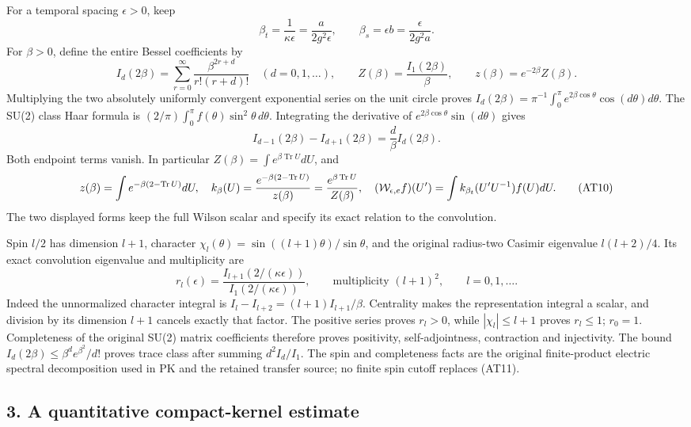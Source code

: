 \documentclass[11pt]{article}
\begin{document}
For a temporal spacing \(\epsilon>0\), keep
\[
 \beta_t=\frac1{\kappa\epsilon}=\frac{a}{2g^2\epsilon},
 \qquad \beta_s=\epsilon b=\frac{\epsilon}{2g^2a}.
 \tag{AT7}
\]
For \(\beta>0\), define the entire Bessel coefficients by
\[
 I_d(2\beta)=\sum_{r=0}^{\infty}
       \frac{\beta^{2r+d}}{r!(r+d)!}\quad(d=0,1,\ldots),\qquad
 Z(\beta)=\frac{I_1(2\beta)}{\beta},\qquad
 z(\beta)=e^{-2\beta}Z(\beta).
 \tag{AT8}
\]
Multiplying the two absolutely uniformly convergent exponential series on the unit circle proves
\(I_d(2\beta)=\pi^{-1}\int_0^\pi e^{2\beta\cos\theta}\cos(d\theta)d\theta\).
The SU(2) class Haar formula is
\((2/\pi)\int_0^\pi f(\theta)\sin^2\theta\,d\theta\).
Integrating the derivative of
\(e^{2\beta\cos\theta}\sin(d\theta)\) gives
\[
 I_{d-1}(2\beta)-I_{d+1}(2\beta)=\frac d\beta I_d(2\beta).
 \tag{AT9}
\]
Both endpoint terms vanish. In particular \(Z(\beta)=\int e^{\beta\operatorname{Tr}U}dU\), and
\[
 z(\beta)=\int e^{-\beta(2-\operatorname{Tr}U)}dU,\quad
 k_\beta(U)=\frac{e^{-\beta(2-\operatorname{Tr}U)}}{z(\beta)}
           =\frac{e^{\beta\operatorname{Tr}U}}{Z(\beta)},\quad
 ({\cal W}_{\epsilon,e}f)(U')=\int k_{\beta_t}(U'U^{-1})f(U)dU.
 \tag{AT10}
\]
The two displayed forms keep the full Wilson scalar and specify its exact relation to the convolution.

Spin \(l/2\) has dimension \(l+1\), character
\(\chi_l(\theta)=\sin((l+1)\theta)/\sin\theta\), and the original radius-two Casimir eigenvalue \(l(l+2)/4\). Its exact convolution eigenvalue and multiplicity are
\[
 r_l(\epsilon)=\frac{I_{l+1}(2/(\kappa\epsilon))}
                       {I_1(2/(\kappa\epsilon))},\qquad
 \text{multiplicity }(l+1)^2,\qquad l=0,1,\ldots .
 \tag{AT11}
\]
Indeed the unnormalized character integral is
\(I_l-I_{l+2}=(l+1)I_{l+1}/\beta\). Centrality makes the representation integral a scalar, and division by its dimension \(l+1\) cancels exactly that factor. The positive series proves \(r_l>0\), while \(|\chi_l|\le l+1\) proves \(r_l\le1\); \(r_0=1\). Completeness of the original SU(2) matrix coefficients therefore proves positivity, self-adjointness, contraction and injectivity. The bound
\(I_d(2\beta)\le\beta^de^{\beta^2}/d!\)
proves trace class after summing \(d^2 I_d/I_1\). The spin and completeness facts are the original finite-product electric spectral decomposition used in PK and the retained transfer source; no finite spin cutoff replaces (AT11).

\subsection*{3. A quantitative compact-kernel estimate}
\end{document}
